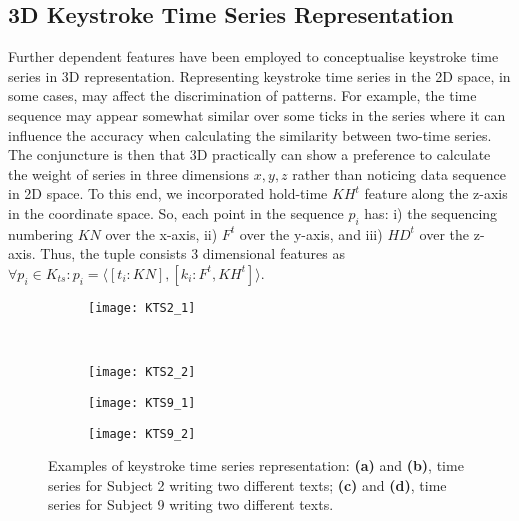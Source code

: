 \documentclass[runningheads,a4paper]{llncs}
\begin{document}
\subsection{3D Keystroke Time Series Representation} \label{subsec:3d_representation}
Further dependent features have been employed to conceptualise keystroke time series in 3D representation. Representing keystroke time series in the 2D space, in some cases, may affect the discrimination of patterns. For example, the time sequence may appear somewhat similar over some ticks in the series where it can influence the accuracy when calculating the similarity between two-time series. The conjuncture is then that 3D practically can show a preference to calculate the weight of series in three dimensions $x,y,z$ rather than noticing data sequence in 2D space. To this end, we incorporated hold-time $KH^t$ feature along the z-axis in the coordinate space. So, each point in the sequence $p_i$ has: i) the sequencing numbering $KN$ over the x-axis, ii) $F^t$ over the y-axis, and iii) $HD^t$ over the z-axis. Thus, the tuple consists 3 dimensional features as $\forall p_i \in K_{ts}: p_i=\langle[t_i:KN],[k_i:F^t,KH^t]\rangle$.  
\begin{figure*}[!t]
    \centering
    \begin{subfigure}{0.4\textwidth}%
        \texttt{[image: KTS2\_1]}
        \caption{}
        \label{}
    \end{subfigure}\hfill
    ~ %
    \begin{subfigure}{0.4\textwidth}
        \texttt{[image: KTS2\_2]}
        \caption{}
        \label{}
    \end{subfigure}
    \begin{subfigure}{0.4\textwidth}
        \texttt{[image: KTS9\_1]}
        \caption{}
        \label{}
    \end{subfigure}\hfill
    \begin{subfigure}{0.4\textwidth}
        \texttt{[image: KTS9\_2]}
        \caption{}
        \label{}
    \end{subfigure}
    \caption{Examples of keystroke time series representation: \textbf{(a)} and \textbf{(b)}, time series for Subject 2 writing two different texts; \textbf{(c)} and \textbf{(d)}, time series for Subject 9 writing two different texts.}
    \label{fig:2D_example}
\end{figure*}      
\end{document}
